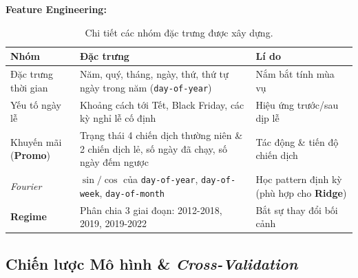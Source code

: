 \documentclass{article}
\begin{document}
\textbf{Feature Engineering:}

\begin{table}[htbp]
\centering
\caption{Chi tiết các nhóm đặc trưng được xây dựng.}
\renewcommand{\arraystretch}{1.2} %
\begin{tabular}{@{} p{3.5cm} p{7cm} p{4.5cm} @{}}
\toprule
\textbf{Nhóm} & \textbf{Đặc trưng} & \textbf{Lí do} \\
\midrule
Đặc trưng thời gian & Năm, quý, tháng, ngày, thứ, thứ tự ngày trong năm (\texttt{day-of-year}) & Nắm bắt tính mùa vụ \\
Yếu tố ngày lễ & Khoảng cách tới Tết, Black Friday, các kỳ nghỉ lễ cố định & Hiệu ứng trước/sau dịp lễ \\
Khuyến mãi (\textbf{Promo}) & Trạng thái 4 chiến dịch thường niên \& 2 chiến dịch lẻ, số ngày đã chạy, số ngày đếm ngược & Tác động \& tiến độ chiến dịch \\
\textit{Fourier} & $\sin / \cos$ của \texttt{day-of-year}, \texttt{day-of-week}, \texttt{day-of-month} & Học pattern định kỳ (phù hợp cho \textbf{Ridge}) \\
\textbf{Regime} & Phân chia 3 giai đoạn: 2012-2018, 2019, 2019-2022 & Bắt sự thay đổi bối cảnh \\
\bottomrule
\end{tabular}
\end{table}

\subsection{Chiến lược Mô hình \& \textit{Cross-Validation}}
\end{document}

